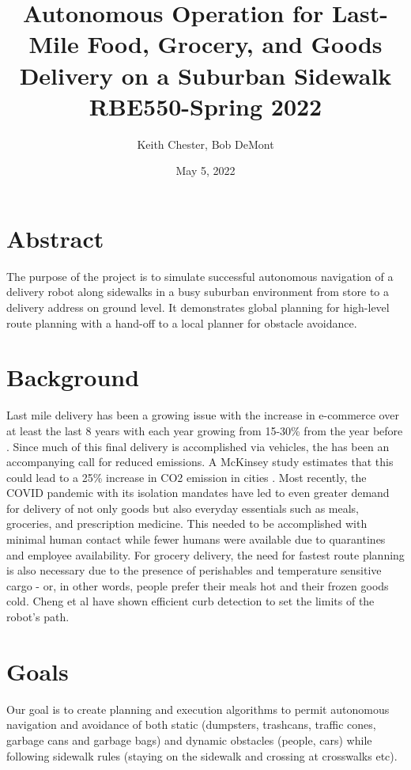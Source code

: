 \documentclass{article}
\title{Autonomous Operation for Last-Mile Food, Grocery, and Goods Delivery on a Suburban Sidewalk\\
\vspace{5mm}
\large RBE550-Spring 2022 }
\author{Keith Chester, Bob DeMont}
\date{May 5, 2022}
\begin{document}
\maketitle

\begin{multicols}{2}
\section*{Abstract}
The purpose of the project is to simulate successful autonomous navigation of a delivery robot along sidewalks in a busy suburban environment from store to a delivery address on ground level.  It demonstrates global planning for high-level route planning with a hand-off to a local planner for obstacle avoidance.

\section*{Background}
Last mile delivery has been a growing issue with the increase in e-commerce over at least the last 8 years with each year growing from 15-30\% from the year before \cite{Ecom}.  Since much of this final delivery is accomplished via vehicles, the has been an accompanying call for reduced emissions.  A McKinsey study estimates that this could lead to a 25\% increase in CO2 emission in cities \cite{Emiss}.  Most recently, the COVID pandemic with its isolation mandates have led to even greater demand for delivery of not only goods but also everyday essentials such as meals, groceries, and prescription medicine.  This needed to be accomplished with minimal human contact while fewer humans were available due to quarantines and employee availability.  For grocery delivery, the need for fastest route planning is also necessary due to the presence of perishables and temperature sensitive cargo - or, in other words, people prefer their meals hot and their frozen goods cold. Cheng et al \cite{Mcheng} have shown efficient curb detection to set the limits of the robot's path.

\section*{Goals}
Our goal is to create planning and execution algorithms to permit autonomous navigation and avoidance of both static (dumpsters, trashcans, traffic cones, garbage cans and garbage bags) and dynamic obstacles (people, cars) while following sidewalk rules (staying on the sidewalk and crossing at crosswalks etc).


\end{multicols}
\end{document}
